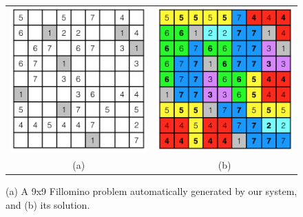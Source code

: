 \begin{figure}[!htpb]
\centering
\begin{tabular}{c c}
\includegraphics[scale=0.40]{puzzlefigs/fillomino_prob.png}
&
\includegraphics[scale=0.40]{puzzlefigs/fillomino_sol.png}
\\
(a) & (b)
\end{tabular}
\caption{(a) A 9x9 Fillomino problem automatically generated by our system, and (b) its solution.}
\label{Fillominoprobsol}
\end{figure}

